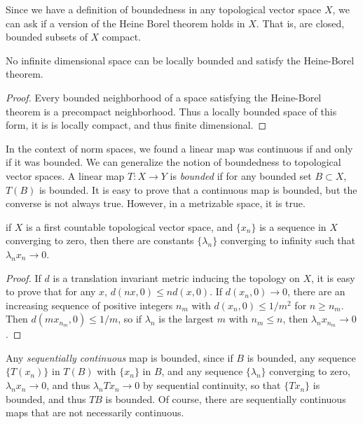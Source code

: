 Since we have a definition of boundedness in any topological vector space $X$, we can ask if a version of the Heine Borel theorem holds in $X$. That is, are closed, bounded subsets of $X$ compact.

\begin{corollary}
    No infinite dimensional space can be locally bounded and satisfy the Heine-Borel theorem.
\end{corollary}
\begin{proof}
    Every bounded neighborhood of a space satisfying the Heine-Borel theorem is a precompact neighborhood. Thus a locally bounded space of this form, it is is locally compact, and thus finite dimensional.
\end{proof}

In the context of norm spaces, we found a linear map was continuous if and only if it was bounded. We can generalize the notion of boundedness to topological vector spaces. A linear map $T: X \to Y$ is \emph{bounded} if for any bounded set $B \subset X$, $T(B)$ is bounded. It is easy to prove that a continuous map is bounded, but the converse is not always true. However, in a metrizable space, it is true.

\begin{lemma}
    if $X$ is a first countable topological vector space, and $\{ x_n \}$ is a sequence in $X$ converging to zero, then there are constants $\{ \lambda_n \}$ converging to infinity such that $\lambda_n x_n \to 0$.
\end{lemma}
\begin{proof}
    If $d$ is a translation invariant metric inducing the topology on $X$, it is easy to prove that for any $x$, $d(nx,0) \leq n d(x,0)$. If $d(x_n,0) \to 0$, there are an increasing sequence of positive integers $n_m$ with $d(x_n,0) \leq 1/m^2$ for $n \geq n_m$. Then $d(mx_{n_m},0) \leq 1/m$, so if $\lambda_n$ is the largest $m$ with $n_m \leq n$, then $\lambda_n x_{n_m} \to 0$.
\end{proof}

Any \emph{sequentially continuous} map is bounded, since if $B$ is bounded, any sequence $\{ T(x_n) \}$ in $T(B)$ with $\{ x_n \}$ in $B$, and any sequence $\{ \lambda_n \}$ converging to zero, $\lambda_n x_n \to 0$, and thus $\lambda_n Tx_n \to 0$ by sequential continuity, so that $\{ Tx_n \}$ is bounded, and thus $TB$ is bounded. Of course, there are sequentially continuous maps that are not necessarily continuous.

